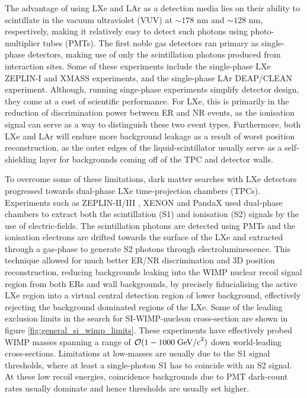 {The advantage of using LXe and LAr as a detection media lies on their ability to scintillate in the vacuum ultraviolet (VUV) at $\sim178$ nm and $\sim128$ nm, respectively, making it relatively easy to detect such photons using photo-multiplier tubes (PMTs). The first noble gas detectors ran primary as single-phase detectors, making use of only the scintillation photons produced from interaction sites. Some of these experiments include the single-phase LXe ZEPLIN-I \cite{zeplin_1} and XMASS \cite{xmass} experiments, and the single-phase LAr DEAP/CLEAN \cite{deap} experiment. Although, running singe-phase experiments simplify detector design, they come at a cost of scientific performance. For LXe, this is primarily in the reduction of discrimination power between ER and NR events, as the ionisation signal can serve as a way to distinguish these two event types. Furthermore, both LXe and LAr will endure more background leakage as a result of worst position reconstruction, as the outer edges of the liquid-scintillator usually serve as a self-shielding layer for backgrounds coming off of the TPC and detector walls.

To overcome some of these limitations, dark matter searches with LXe detectors progressed towards dual-phase LXe time-projection chambers (TPCs). Experiments such as ZEPLIN-II/III \cite{zeplin2, zeplin3}, XENON \cite{xenon100} and PandaX \cite{pandax} used dual-phase chambers to extract both the scintillation (S1) and ionisation (S2) signals by the use of electric-fields. The scintillation photons are detected using PMTs and the ionisation electrons are drifted towards the surface of the LXe and extracted through a gas-phase to generate S2 photons through electroluminescence. This technique allowed for much better ER/NR discrimination and 3D position reconstruction, reducing backgrounds leaking into the WIMP nuclear recoil signal region from both ERs and wall backgrounds, by precisely fiducialising the active LXe region into a virtual central detection region of lower background, effectively rejecting the background dominated regions of the LXe. Some of the leading exclusion limits in the search for SI-WIMP-nucleon cross-section are shown in figure \ref{fig:general_si_wimp_limits}. These experiments have effectively probed WIMP masses spanning a range of $\mathcal{O}(1-1000 \; \text{GeV/c}^2)$ down world-leading cross-sections. Limitations at low-masses are usually due to the S1 signal thresholds, where at least a single-photon S1 has to coincide with an S2 signal. At these low recoil energies, coincidence backgrounds due to PMT dark-count rates usually dominate and hence thresholds are usually set higher. 

}
